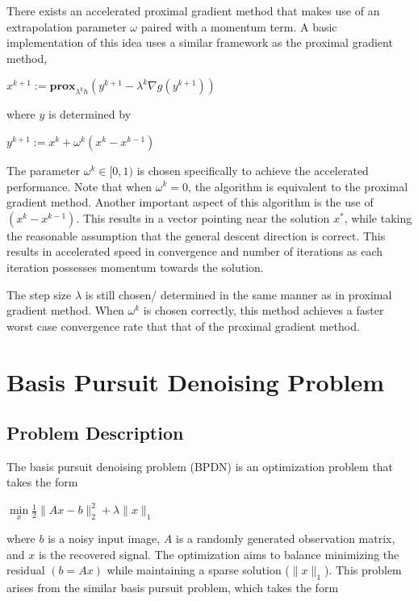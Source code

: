 \documentclass[10pt]{article} %
\begin{document}
\vspace{\baselineskip}

There exists an accelerated proximal gradient method that makes use of an extrapolation parameter $\omega$ paired with a momentum term. A basic implementation of this idea uses a similar framework as the proximal gradient method,  

\begin{center}
    $x^{k+1} := \mathbf{prox}_{\lambda^k h} (y^{k+1} - \lambda^k \nabla g(y^{k+1}))$
\end{center}

\noindent where $y$ is determined by

\begin{center}
    $y^{k+1} := x^{k} + \omega^k(x^k - x^{k-1})$    
\end{center}

\noindent The parameter $\omega^k \in [0, 1)$ is chosen specifically to achieve the accelerated performance. Note that when $\omega^k = 0$, the algorithm is equivalent to the proximal gradient method. Another important aspect of this algorithm is the use of $(x^k - x^{k-1})$. This results in a vector pointing near the solution $x^*$, while taking the reasonable assumption that the general descent direction is correct. This results in accelerated speed in convergence and number of iterations as each iteration possesses momentum towards the solution. 

The step size $\lambda$ is still chosen/ determined in the same manner as in proximal gradient method. When $\omega^k$ is chosen correctly, this method achieves a faster worst case convergence rate that that of the proximal gradient method. 


\section{Basis Pursuit Denoising Problem}

\subsection{Problem Description}

The basis pursuit denoising problem (BPDN) is an optimization problem that takes the form 

\begin{center}
    $ \underset{x}{\min} \frac{1}{2} \|Ax-b\|_2^2 + \lambda \|x\|_1$
\end{center}

where $b$ is a noisy input image, $A$ is a randomly generated observation matrix, and $x$ is the recovered signal. The optimization aims to balance minimizing the residual $(b=Ax)$ while maintaining a sparse solution ($\|x\|_1$). This problem arises from the similar basis pursuit problem, which takes the form 
\end{document}
